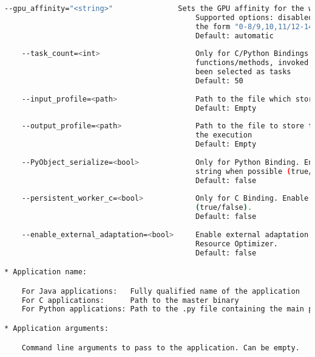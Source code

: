 \begin{lstlisting}[language=bash]
    --gpu_affinity="<string>"               Sets the GPU affinity for the workers
                                            Supported options: disabled, automatic, user defined map of
                                            the form "0-8/9,10,11/12-14,15,16"
                                            Default: automatic
                                            
    --task_count=<int>                      Only for C/Python Bindings. Maximum number of different
                                            functions/methods, invoked from the application, that have
                                            been selected as tasks
                                            Default: 50
                                            
    --input_profile=<path>                  Path to the file which stores the input application profile
                                            Default: Empty
                                            
    --output_profile=<path>                 Path to the file to store the application profile at the end of
                                            the execution
                                            Default: Empty 
                                            
    --PyObject_serialize=<bool>             Only for Python Binding. Enable the object serialization to
                                            string when possible (true/false).
                                            Default: false
                                            
    --persistent_worker_c=<bool>            Only for C Binding. Enable the persistent worker in c
                                            (true/false).
                                            Default: false
                                            
    --enable_external_adaptation=<bool>     Enable external adaptation. This option will disable the
                                            Resource Optimizer.
                                            Default: false

* Application name:

    For Java applications:   Fully qualified name of the application
    For C applications:      Path to the master binary
    For Python applications: Path to the .py file containing the main program

* Application arguments:

    Command line arguments to pass to the application. Can be empty.
\end{lstlisting}


